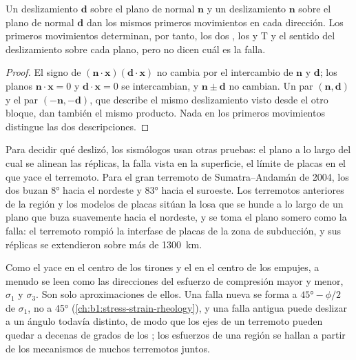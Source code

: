 \begin{proposition}\label{prop:b1:earthquake-source:auxiliary}
Un deslizamiento $\mathbf d$ sobre el plano de normal $\mathbf n$ y un deslizamiento $\mathbf n$ sobre el plano de normal $\mathbf d$
dan los mismos primeros movimientos en cada dirección. Los primeros movimientos determinan, por tanto, los dos , los  y T
y el sentido del deslizamiento sobre cada plano, pero no dicen cuál  es la falla.
\end{proposition}

\begin{proof}
El signo de $(\mathbf n\cdot\mathbf x)(\mathbf d\cdot\mathbf x)$ no cambia por el intercambio de $\mathbf n$ y $\mathbf d$; los planos
$\mathbf n\cdot\mathbf x = 0$ y $\mathbf d\cdot\mathbf x = 0$ se intercambian,
y $\mathbf n \pm \mathbf d$ no cambian. Un par $(\mathbf n, \mathbf d)$ y
el par $(-\mathbf n, -\mathbf d)$, que describe el mismo deslizamiento visto desde el otro bloque, dan también el mismo producto. Nada en los
primeros movimientos distingue las dos descripciones.
\end{proof}

Para decidir qué  deslizó, los sismólogos usan otras pruebas: el plano a lo largo del cual se alinean las réplicas, la falla vista
en la superficie, el límite de placas en el que yace el terremoto. Para el gran terremoto de Sumatra--Andamán de 2004, los dos  buzan \ang{8} hacia el nordeste y \ang{83} hacia el suroeste. Los terremotos anteriores de la región y los modelos de placas sitúan
la losa que se hunde a lo largo de un plano que buza suavemente hacia el nordeste, y se toma el plano somero como la falla: el terremoto
rompió la interfase de placas de la zona de subducción, y sus réplicas se extendieron sobre más de \qty{1300}{km}.

Como el  yace en el centro de los tirones y el  en el centro de los empujes, a menudo se leen como las direcciones del esfuerzo
de compresión mayor y menor, $\sigma_1$ y $\sigma_3$. Son solo aproximaciones de ellos. Una falla nueva se forma a $\ang{45} - \phi/2$ de
$\sigma_1$, no a \ang{45} (\cref{ch:b1:stress-strain-rheology}), y una falla antigua puede deslizar a un ángulo todavía distinto, de modo que los ejes de un
terremoto pueden quedar a decenas de grados de los ; los esfuerzos de una región se hallan a partir de los mecanismos de
muchos terremotos juntos.

